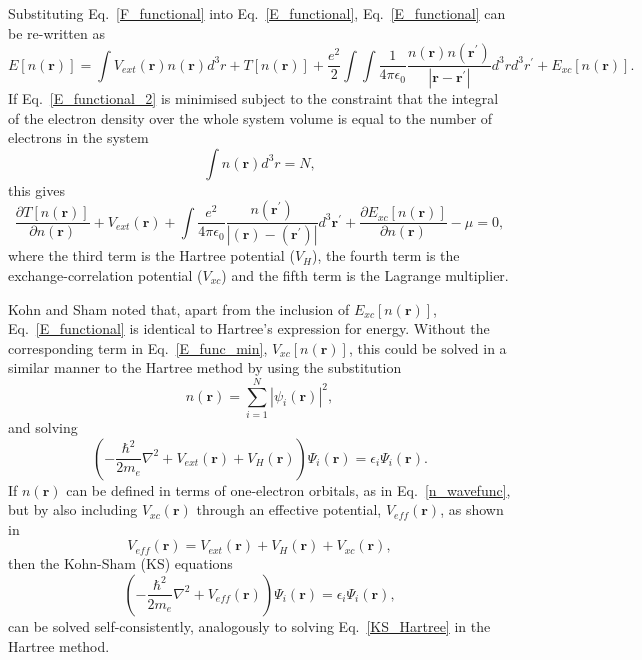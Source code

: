 \documentclass[11pt, twoside]{report}
\begin{document}
Substituting Eq.~\ref{F_functional} into Eq.~\ref{E_functional}, Eq.~\ref{E_functional} can be re-written as
\begin{equation}\label{E_functional_2}
E[n(\boldsymbol{r})] = \int V_{ext}(\boldsymbol{r})n(\boldsymbol{r})d^3r + T[n(\boldsymbol{r})] + \frac{e^2}{2}\int \int \frac{1}{4\pi \epsilon_0}\frac{n(\boldsymbol{r})n(\boldsymbol{r^{\prime}})}{|\boldsymbol{r} - \boldsymbol{r^{\prime}}|}d^3rd^3r^{\prime} + E_{xc}[n(\boldsymbol{r})] .
\end{equation}
If Eq.~\ref{E_functional_2} is minimised subject to the constraint that the integral of the electron density over the whole system volume is equal to the number of electrons in the system
\begin{equation}\label{n_constraint}
\int n(\boldsymbol{r})d^3r = N,
\end{equation}
this gives
\begin{equation}\label{E_func_min}
\frac{\partial T[n(\boldsymbol{r})]}{\partial n(\boldsymbol{r})} + V_{ext}(\boldsymbol{r}) + \int \frac{e^2}{4\pi \epsilon_0}\frac{n(\boldsymbol{r^{\prime}})}{|(\boldsymbol{r})-(\boldsymbol{r^{\prime}})|}d^3\boldsymbol{r^{\prime}} + \frac{\partial E_{xc}[n(\boldsymbol{r})]}{\partial n(\boldsymbol{r})} - \mu = 0,
\end{equation}
where the third term is the Hartree potential ($V_H$), the fourth term is the exchange-correlation potential ($V_{xc}$) and the fifth term is the Lagrange multiplier.

Kohn and Sham noted that, apart from the inclusion of $E_{xc}[n(\boldsymbol{r})]$, Eq.~\ref{E_functional} is identical to Hartree's expression for energy. Without the corresponding term in Eq.~\ref{E_func_min}, $V_{xc}[n(\boldsymbol{r})]$, this could be solved in a similar manner to the Hartree method by using the substitution 
\begin{equation}\label{n_wavefunc}
n(\boldsymbol{r}) = \sum^N_{i=1} |\psi_i(\boldsymbol{r})|^{2},
\end{equation}
and solving
\begin{equation}\label{KS_Hartree}
\left( -\frac{\hbar^2}{2m_e}\nabla^2 + V_{ext}(\boldsymbol{r}) + V_H(\boldsymbol{r}) \right) \Psi_i(\boldsymbol{r}) = \epsilon_i \Psi_i(\boldsymbol{r}) .
\end{equation}
If $n(\boldsymbol{r})$ can be defined in terms of one-electron orbitals, as in Eq.~\ref{n_wavefunc}, but by also including $V_{xc}(\boldsymbol{r})$ through an effective potential, $V_{eff}(\boldsymbol{r})$, as shown in 
\begin{equation}\label{KS_pot}
V_{eff}(\mathbf{r}) = V_{ext}(\mathbf{r}) + V_H(\mathbf{r}) + V_{xc}(\mathbf{r}),
\end{equation}
then the Kohn-Sham (KS) equations
\begin{equation}\label{KS_eq}
\left( -\frac{\hbar^2}{2m_e}\nabla^2 + V_{eff}(\mathbf{r}) \right) \Psi_i(\mathbf{r}) = \epsilon_i \Psi_i(\mathbf{r}),
\end{equation}
can be solved self-consistently, analogously to solving Eq.~\ref{KS_Hartree} in the Hartree method.
\end{document}
